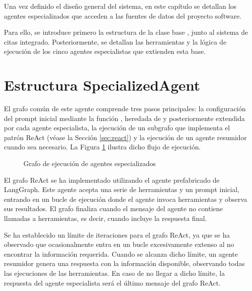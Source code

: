 Una vez definido el diseño general del sistema, en este capítulo se detallan los agentes especializados que acceden a las fuentes de datos del proyecto software.

Para ello, se introduce primero la estructura de la clase base , junto al sistema de citas integrado. Posteriormente, se detallan las herramientas y la lógica de ejecución de los cinco agentes especialistas que extienden esta base.

\section{Estructura SpecializedAgent}
El grafo común de este agente comprende tres pasos principales: la configuración del prompt inicial mediante la función , heredada de  y posteriormente extendida por cada agente especialista, la ejecución de un subgrafo que implementa el patrón ReAct (véase la Sección \ref{sec:react}) y la ejecución de un agente resumidor cuando sea necesario. La Figura \ref{fig:specialized} ilustra dicho flujo de ejecución.

\begin{figure}[h]
  \centering
  \caption{Grafo de ejecución de agentes especializados}
  \label{fig:specialized}
\end{figure}

El grafo ReAct se ha implementado utilizando el agente prefabricado  de LangGraph. Este agente acepta una serie de herramientas y un prompt inicial, entrando en un bucle de ejecución donde el agente invoca herramientas y observa sus resultados. El grafo finaliza cuando el mensaje del agente no contiene llamadas a herramientas, es decir, cuando incluye la respuesta final.

Se ha establecido un límite de iteraciones para el grafo ReAct, ya que se ha observado que ocasionalmente entra en un bucle excesivamente extenso al no encontrar la información requerida. Cuando se alcanza dicho límite, un agente resumidor genera una respuesta con la información disponible, observando todas las ejecuciones de las herramientas. En caso de no llegar a dicho límite, la respuesta del agente especialista será el último mensaje del grafo ReAct.

